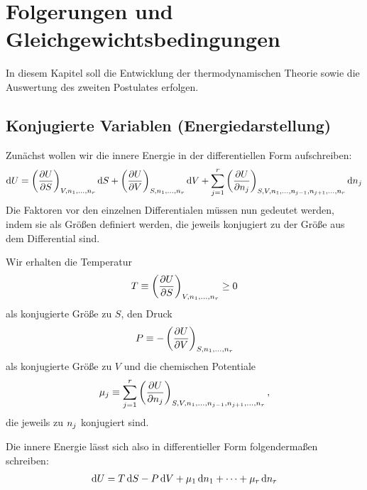 
\section{Folgerungen und Gleichgewichtsbedingungen}

In diesem Kapitel soll die Entwicklung der thermodynamischen Theorie sowie die Auswertung des zweiten Postulates erfolgen. 

\subsection{Konjugierte Variablen (Energiedarstellung)}

Zunächst wollen wir die innere Energie in der differentiellen Form aufschreiben: 
\begin{align*}
    \mathop{}\!\mathrm{d} U = \left(\frac{\partial U}{\partial S}\right)_{V,n_1,\ldots,n_r} \mathop{}\!\mathrm{d} S + \left(\frac{\partial U}{\partial V}\right)_{S,n_1,\ldots,n_r} \mathop{}\!\mathrm{d} V + \sum_{j = 1}^r \left(\frac{\partial U}{\partial n_j}\right)_{S,V,n_1,\ldots,n_{j - 1},n_{j + 1},\ldots,n_r} \mathop{}\!\mathrm{d} n_j
\end{align*}
Die Faktoren vor den einzelnen Differentialen müssen nun gedeutet werden, indem sie als Größen definiert werden, die jeweils konjugiert zu der Größe aus dem Differential sind. 

Wir erhalten die Temperatur 
\begin{align}
    \label{eq:def_temperatur}
    T \equiv \left(\frac{\partial U}{\partial S}\right)_{V,n_1,\ldots,n_r} \geq 0
\end{align}
als konjugierte Größe zu $S$, den Druck 
\begin{align}
    \label{eq:def_druck}
    P \equiv -\left(\frac{\partial U}{\partial V}\right)_{S,n_1,\ldots,n_r} 
\end{align}
als konjugierte Größe zu $V$ und die chemischen Potentiale
\begin{align}
    \label{eq:def_chemische_potentiale}
    \mu_j \equiv \sum_{j = 1}^r \left(\frac{\partial U}{\partial n_j}\right)_{S,V,n_1,\ldots,n_{j - 1},n_{j + 1},\ldots,n_r},
\end{align}
die jeweils zu $n_j$ konjugiert sind. 

Die innere Energie lässt sich also in differentieller Form folgendermaßen schreiben:
\begin{align}
    \label{eq:innere_energie_differentielle_form}
    \mathop{}\!\mathrm{d} U = T\mathop{}\!\mathrm{d} S - P \mathop{}\!\mathrm{d} V + \mu_1 \mathop{}\!\mathrm{d} n_1 + \cdots + \mu_r \mathop{}\!\mathrm{d} n_r
\end{align}

